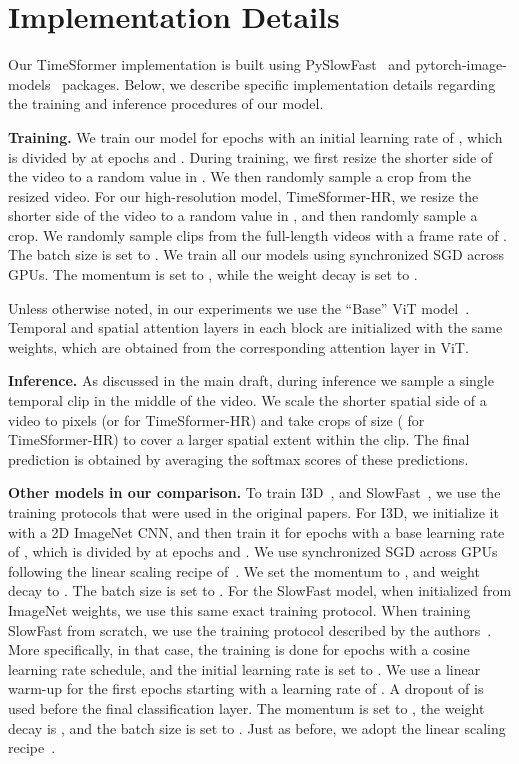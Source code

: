 \documentclass{article}
\begin{document}
\setcounter{figure}{0}
\setcounter{table}{0}
\renewcommand{\thetable}{A.\arabic{table}}
\renewcommand{\thefigure}{A.\arabic{figure}}




\section{Implementation Details}

Our TimeSformer implementation is built using PySlowFast~\cite{fan2020pyslowfast} and pytorch-image-models~\cite{rw2019timm} packages. Below, we describe specific implementation details regarding the training and inference procedures of our model.

\textbf{Training.} We train our model for  epochs with an initial learning rate of , which is divided by  at epochs  and . During training, we first resize the shorter side of the video to a random value in . We then randomly sample a  crop from the resized video. For our high-resolution model, TimeSformer-HR, we resize the shorter side of the video to a random value in , and then randomly sample a  crop. We randomly sample clips from the full-length videos with a frame rate of . The batch size is set to . We train all our models using synchronized SGD across  GPUs. The momentum is set to , while the weight decay is set to . 

Unless otherwise noted, in our experiments we use the ``Base'' ViT model~\cite{Dosovitskiy:ICLR2021}.  Temporal and spatial attention layers in each block are initialized with the same weights, which are obtained from the corresponding attention layer in ViT. 

\textbf{Inference.} As discussed in the main draft, during inference we sample a single temporal clip in the middle of the video. We scale the shorter spatial side of a video to  pixels (or  for TimeSformer-HR) and take  crops of size  ( for TimeSformer-HR) to cover a larger spatial extent within the clip. The final prediction is obtained by averaging the softmax scores of these  predictions.


\textbf{Other models in our comparison.} To train I3D~\cite{DBLP:conf/cvpr/CarreiraZ17}, and SlowFast~\cite{slowfast}, we use the training protocols that were used in the original papers. For I3D, we initialize it with a 2D ImageNet CNN, and then train it for  epochs with a base learning rate of , which is divided by  at epochs  and . We use synchronized SGD across  GPUs following the linear scaling recipe of~\citet{goyal2017imagenet1hr}. We set the momentum to , and weight decay to . The batch size is set to . For the SlowFast model, when initialized from ImageNet weights, we use this same exact training protocol. When training SlowFast from scratch, we use the training protocol described by the authors~\cite{slowfast}. More specifically, in that case, the training is done for  epochs with a cosine learning rate schedule, and the initial learning rate is set to . We use a linear warm-up for the first  epochs starting with a learning rate of . A dropout of  is used before the final classification layer. The momentum is set to , the weight decay is , and the batch size is set to . Just as before, we adopt the linear scaling recipe~\cite{goyal2017imagenet1hr}.
\end{document}
